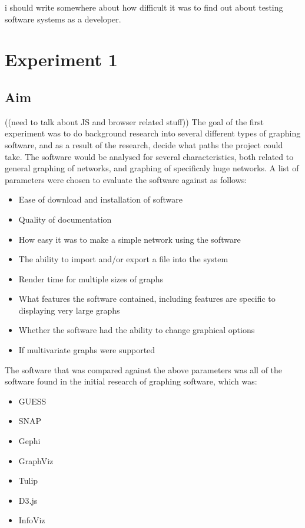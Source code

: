 \documentclass{l4proj}
\begin{document}
i should write somewhere about how difficult it was to find out about testing software systems as a developer.


\chapter{Experiment 1}


\section{Aim} 
((need to talk about JS and browser related stuff))
The goal of the first experiment was to do background research into several different types of graphing software, and as a result of the research, decide what paths the project could take. The software would be analysed for several characteristics, both related to general graphing of networks, and graphing of specificaly huge networks. A list of parameters were chosen to evaluate the software against as follows:
\begin{itemize}
	\item Ease of download and installation of software
	\item Quality of documentation 
	\item How easy it was to make a simple network using the software
	\item The ability to import and/or export a file into the system
	\item Render time for multiple sizes of graphs
	\item What features the software contained, including features are specific to displaying very large graphs
	\item Whether the software had the ability to change graphical options
	\item If multivariate graphs were supported
\end{itemize}

The software that was compared against the above parameters was all of the software found in the initial research of graphing software, which was:
\begin{itemize}
	\item GUESS
	\item SNAP
	\item Gephi
	\item GraphViz
	\item Tulip
	\item D3.js
	\item InfoViz
\end{itemize}
\end{document}
